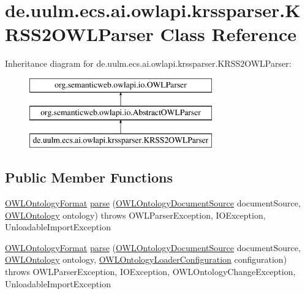\hypertarget{classde_1_1uulm_1_1ecs_1_1ai_1_1owlapi_1_1krssparser_1_1_k_r_s_s2_o_w_l_parser}{\section{de.\-uulm.\-ecs.\-ai.\-owlapi.\-krssparser.\-K\-R\-S\-S2\-O\-W\-L\-Parser Class Reference}
\label{classde_1_1uulm_1_1ecs_1_1ai_1_1owlapi_1_1krssparser_1_1_k_r_s_s2_o_w_l_parser}
}
Inheritance diagram for de.\-uulm.\-ecs.\-ai.\-owlapi.\-krssparser.\-K\-R\-S\-S2\-O\-W\-L\-Parser\-:\begin{figure}[H]
\begin{center}
\leavevmode
\includegraphics[height=3.000000cm]{classde_1_1uulm_1_1ecs_1_1ai_1_1owlapi_1_1krssparser_1_1_k_r_s_s2_o_w_l_parser}
\end{center}
\end{figure}
\subsection*{Public Member Functions}
\begin{DoxyCompactItemize}
\item 
\hyperlink{classorg_1_1semanticweb_1_1owlapi_1_1model_1_1_o_w_l_ontology_format}{O\-W\-L\-Ontology\-Format} \hyperlink{classde_1_1uulm_1_1ecs_1_1ai_1_1owlapi_1_1krssparser_1_1_k_r_s_s2_o_w_l_parser_afd2431fc79f0a84255f0e6da71e5c0df}{parse} (\hyperlink{interfaceorg_1_1semanticweb_1_1owlapi_1_1io_1_1_o_w_l_ontology_document_source}{O\-W\-L\-Ontology\-Document\-Source} document\-Source, \hyperlink{interfaceorg_1_1semanticweb_1_1owlapi_1_1model_1_1_o_w_l_ontology}{O\-W\-L\-Ontology} ontology)  throws O\-W\-L\-Parser\-Exception, I\-O\-Exception,             Unloadable\-Import\-Exception 
\item 
\hyperlink{classorg_1_1semanticweb_1_1owlapi_1_1model_1_1_o_w_l_ontology_format}{O\-W\-L\-Ontology\-Format} \hyperlink{classde_1_1uulm_1_1ecs_1_1ai_1_1owlapi_1_1krssparser_1_1_k_r_s_s2_o_w_l_parser_a7b040e07a34e8fa3dc9bd3b8a9d3b152}{parse} (\hyperlink{interfaceorg_1_1semanticweb_1_1owlapi_1_1io_1_1_o_w_l_ontology_document_source}{O\-W\-L\-Ontology\-Document\-Source} document\-Source, \hyperlink{interfaceorg_1_1semanticweb_1_1owlapi_1_1model_1_1_o_w_l_ontology}{O\-W\-L\-Ontology} ontology, \hyperlink{classorg_1_1semanticweb_1_1owlapi_1_1model_1_1_o_w_l_ontology_loader_configuration}{O\-W\-L\-Ontology\-Loader\-Configuration} configuration)  throws O\-W\-L\-Parser\-Exception, I\-O\-Exception, O\-W\-L\-Ontology\-Change\-Exception,             Unloadable\-Import\-Exception 
\end{DoxyCompactItemize}
